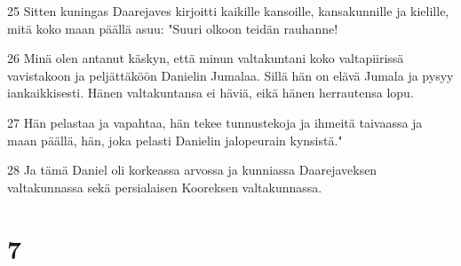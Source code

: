 \par 25 Sitten kuningas Daarejaves kirjoitti kaikille kansoille, kansakunnille ja kielille, mitä koko maan päällä asuu: "Suuri olkoon teidän rauhanne!
\par 26 Minä olen antanut käskyn, että minun valtakuntani koko valtapiirissä vavistakoon ja peljättäköön Danielin Jumalaa. Sillä hän on elävä Jumala ja pysyy iankaikkisesti. Hänen valtakuntansa ei häviä, eikä hänen herrautensa lopu.
\par 27 Hän pelastaa ja vapahtaa, hän tekee tunnustekoja ja ihmeitä taivaassa ja maan päällä, hän, joka pelasti Danielin jalopeurain kynsistä."
\par 28 Ja tämä Daniel oli korkeassa arvossa ja kunniassa Daarejaveksen valtakunnassa sekä persialaisen Kooreksen valtakunnassa.

\chapter{7}

